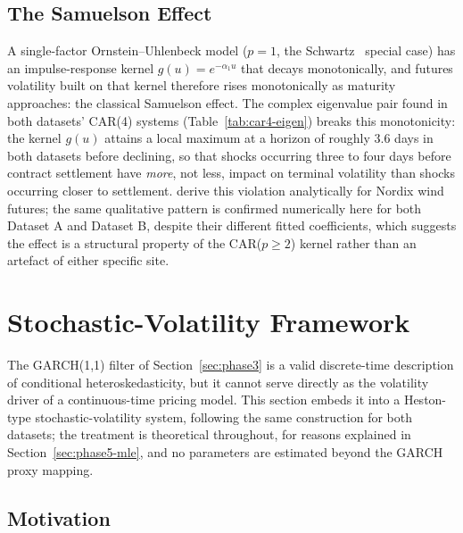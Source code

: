 \documentclass[11pt, a4paper, twoside]{article}
\begin{document}
\subsection{The Samuelson Effect}
\label{sec:phase4-samuelson}

A single-factor Ornstein--Uhlenbeck model ($p=1$, the Schwartz~\citeyearpar{Schwartz1997} special case) has an impulse-response kernel $g(u) = e^{-\alpha_1 u}$ that decays monotonically, and futures volatility built on that kernel therefore rises monotonically as maturity approaches: the classical Samuelson effect. The complex eigenvalue pair found in both datasets' CAR(4) systems (Table~\ref{tab:car4-eigen}) breaks this monotonicity: the kernel $g(u)$ attains a local maximum at a horizon of roughly 3.6 days in both datasets before declining, so that shocks occurring three to four days before contract settlement have \emph{more}, not less, impact on terminal volatility than shocks occurring closer to settlement. \citet{BenthSaltyteBenth2009} derive this violation analytically for Nordix wind futures; the same qualitative pattern is confirmed numerically here for both Dataset A and Dataset B, despite their different fitted coefficients, which suggests the effect is a structural property of the CAR($p\geq2$) kernel rather than an artefact of either specific site.

\section{Stochastic-Volatility Framework}
\label{sec:phase5}

The GARCH(1,1) filter of Section~\ref{sec:phase3} is a valid discrete-time description of conditional heteroskedasticity, but it cannot serve directly as the volatility driver of a continuous-time pricing model. This section embeds it into a Heston-type \citep{Heston1993} stochastic-volatility system, following the same construction for both datasets; the treatment is theoretical throughout, for reasons explained in Section~\ref{sec:phase5-mle}, and no parameters are estimated beyond the GARCH proxy mapping.

\subsection{Motivation}
\label{sec:phase5-motivation}
\end{document}
